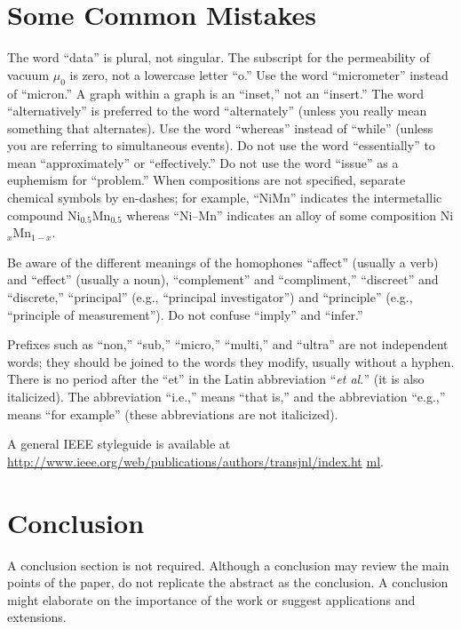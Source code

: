 \documentclass[journal,twoside,web]{ieeecolor}
\begin{document}
\section{Some Common Mistakes}
The word ``data'' is plural, not singular. The subscript for the
permeability of vacuum $\mu _{0}$ is zero, not a lowercase letter
``o.'' Use the word ``micrometer'' instead of ``micron.'' A graph within a graph is an
``inset,'' not an ``insert.'' The word ``alternatively'' is preferred to the
word ``alternately'' (unless you really mean something that alternates). Use
the word ``whereas'' instead of ``while'' (unless you are referring to
simultaneous events). Do not use the word ``essentially'' to mean
``approximately'' or ``effectively.'' Do not use the word ``issue'' as a
euphemism for ``problem.'' When compositions are not specified, separate
chemical symbols by en-dashes; for example, ``NiMn'' indicates the
intermetallic compound Ni$_{0.5}$Mn$_{0.5}$ whereas
``Ni--Mn'' indicates an alloy of some composition
Ni$_{x}$Mn$_{1-x}$.

Be aware of the different meanings of the homophones ``affect'' (usually a
verb) and ``effect'' (usually a noun), ``complement'' and ``compliment,''
``discreet'' and ``discrete,'' ``principal'' (e.g., ``principal
investigator'') and ``principle'' (e.g., ``principle of measurement''). Do
not confuse ``imply'' and ``infer.''

Prefixes such as ``non,'' ``sub,'' ``micro,'' ``multi,'' and ``ultra'' are
not independent words; they should be joined to the words they modify,
usually without a hyphen. There is no period after the ``et'' in the Latin
abbreviation ``\emph{et al.}'' (it is also italicized). The abbreviation ``i.e.,'' means
``that is,'' and the abbreviation ``e.g.,'' means ``for example'' (these
abbreviations are not italicized).

A general IEEE styleguide is available at \underline{http://www.ieee.org/web/publications/authors/transjnl/index.ht}
\discretionary{}{}{}\underline{ml}.

\section{Conclusion}
A conclusion section is not required. Although a conclusion may review the
main points of the paper, do not replicate the abstract as the conclusion.
A conclusion might elaborate on the importance of the work or suggest
applications and extensions.

\appendices
\end{document}
